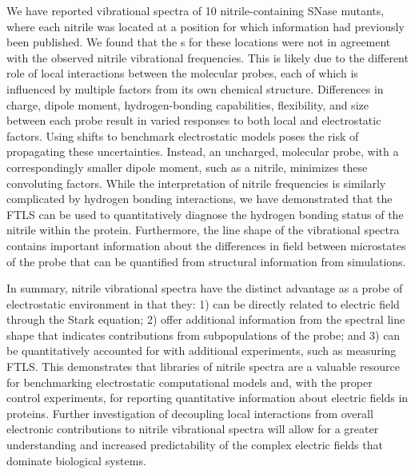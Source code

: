 We have reported vibrational spectra of 10 nitrile-containing SNase mutants, where each nitrile was located at a position for which \dpKa{} information had previously been published. 
We found that the \pKa{}s for these locations were not in agreement with the observed nitrile vibrational frequencies. 
This is likely due to the different role of local interactions between the molecular probes, each of which is influenced by multiple factors from its own chemical structure. 
Differences in charge, dipole moment, hydrogen-bonding capabilities, flexibility, and size between each \pKa{} probe result in varied responses to both local and electrostatic factors. 
Using \pKa{} shifts to benchmark electrostatic models poses the risk of propagating these uncertainties. 
Instead, an uncharged, molecular probe, with a correspondingly smaller dipole moment, such as a nitrile, minimizes these convoluting factors. 
While the interpretation of nitrile frequencies is similarly complicated by hydrogen bonding interactions, we have demonstrated that the FTLS can be used to quantitatively diagnose the hydrogen bonding status of the nitrile within the protein. 
Furthermore, the line shape of the vibrational spectra contains important information about the differences in field between microstates of the probe that can be quantified from structural information from simulations.

In summary, nitrile vibrational spectra have the distinct advantage as a probe of electrostatic environment in that they: 
1) can be directly related to electric field through the Stark equation; 
2) offer additional information from the spectral line shape that indicates contributions from subpopulations of the probe; and 
3) can be quantitatively accounted for with additional experiments, such as measuring FTLS. 
This demonstrates that libraries of nitrile spectra are a valuable resource for benchmarking electrostatic computational models and, with the proper control experiments, for reporting quantitative information about electric fields in proteins. 
Further investigation of decoupling local interactions from overall electronic contributions to nitrile vibrational spectra will allow for a greater understanding and increased predictability of the complex electric fields that dominate biological systems.

